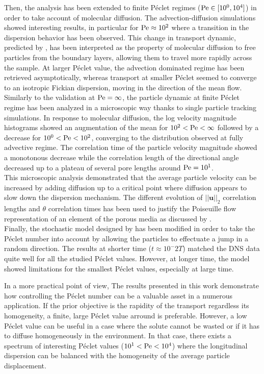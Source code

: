 Then, the analysis has been extended to finite Péclet regimes ($\mathrm{Pe}\in[10^0, 10^4]$) in order to take account of molecular diffusion.
The advection-diffusion simulations showed interesting results, in particular for $\mathrm{Pe}\approx 10^2$ where a transition in the dispersion behavior has been observed.
This change in transport dynamic, predicted by \citet{Meyer2016}, has been interpreted as the property of molecular diffusion to free particles from the boundary layers, allowing them to travel more rapidly across the sample.
At larger Péclet value, the advection dominated regime has been retrieved asymptotically, whereas transport at smaller Péclet seemed to converge to an isotropic Fickian dispersion, moving in the direction of the mean flow.\\
Similarly to the validation at $\mathrm{Pe} = \infty$, the particle dynamic at finite Péclet regime has been analyzed in a microscopic way thanks to single particle tracking simulations.
In response to molecular diffusion, the log velocity magnitude histograms showed an augmentation of the mean for $10^2<\mathrm{Pe}<\infty$ followed by a decrease for $10^0<\mathrm{Pe}<10^2$, converging to the distribution observed at fully advective regime.
The correlation time of the particle velocity magnitude showed a monotonous decrease while the correlation length of the directional angle decreased up to a plateau of several pore lengths around $\mathrm{Pe}=10^1$.\\
This microscopic analysis demonstrated that the average particle velocity can be increased by adding diffusion up to a critical point where diffusion appears to slow down the dispersion mechanism.
The different evolution of $||\textbf{u}||_2$ correlation lengths and $\theta$ correlation times has been used to justify the Poiseuille flow representation of an element of the porous media as discussed by \citet{Dentz2017}.\\

Finally, the stochastic model designed by \citet{Meyer2016} has been modified in order to take the Péclet number into account by allowing the particles to effectuate a jump in a random direction.
The results at shorter time ($t\approx10^-2 T$) matched the DNS data quite well for all the studied Péclet values.
However, at longer time, the model showed limitations for the smallest Péclet values, especially at large time.

In a more practical point of view, The results presented in this work demonstrate how controlling the Péclet number can be a valuable asset in a numerous application. 
If the prior objective is the rapidity of the transport regardless its homogeneity, a finite, large Péclet value arround is preferable. 
However, a low Péclet value can be useful in a case where the solute cannot be wasted or if it has to diffuse homogeneously in the environment.
In that case, there exists a spectrum of interesting Péclet values ($10^1<\mathrm{Pe}<10^4$) where the longitudinal dispersion can be balanced with the homogeneity of the average particle displacement.

